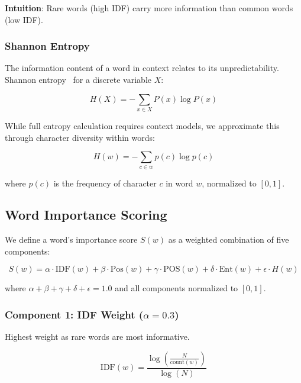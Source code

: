 \textbf{Intuition}: Rare words (high IDF) carry more information than common words (low IDF).

\subsubsection{Shannon Entropy}

The information content of a word in context relates to its unpredictability. Shannon entropy~\cite{shannon1948mathematical} for a discrete variable $X$:

\begin{equation}
H(X) = -\sum_{x \in X} P(x) \log P(x)
\end{equation}

While full entropy calculation requires context models, we approximate this through character diversity within words:

\begin{equation}
H(w) = -\sum_{c \in w} p(c) \log p(c)
\end{equation}

where $p(c)$ is the frequency of character $c$ in word $w$, normalized to $[0, 1]$.

\subsection{Word Importance Scoring}

We define a word's importance score $S(w)$ as a weighted combination of five components:

\begin{equation}
S(w) = \alpha \cdot \text{IDF}(w) + \beta \cdot \text{Pos}(w) + \gamma \cdot \text{POS}(w) + \delta \cdot \text{Ent}(w) + \epsilon \cdot H(w)
\end{equation}

where $\alpha + \beta + \gamma + \delta + \epsilon = 1.0$ and all components normalized to $[0, 1]$.

\subsubsection{Component 1: IDF Weight ($\alpha = 0.3$)}

Highest weight as rare words are most informative.

\begin{equation}
\text{IDF}(w) = \frac{\log\left(\frac{N}{\text{count}(w)}\right)}{\log(N)}
\end{equation}

